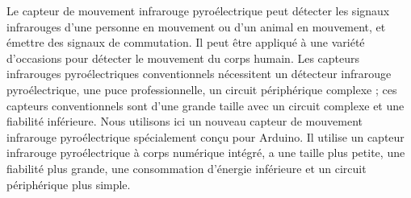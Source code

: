 \documentclass[a4paper, 11pt]{article}           %
\begin{document}
Le capteur de mouvement infrarouge pyroélectrique peut détecter les signaux infrarouges d'une personne en mouvement ou d'un animal en mouvement, et émettre des signaux de commutation. Il peut être appliqué à une variété d'occasions pour détecter le mouvement du corps humain. Les capteurs infrarouges pyroélectriques conventionnels nécessitent un détecteur infrarouge pyroélectrique, une puce professionnelle, un circuit périphérique complexe ; ces capteurs conventionnels sont d'une grande taille avec un circuit complexe et une fiabilité inférieure. Nous utilisons ici un nouveau capteur de mouvement infrarouge pyroélectrique spécialement conçu pour Arduino. Il utilise un capteur infrarouge pyroélectrique à corps numérique intégré, a une taille plus petite, une fiabilité plus grande, une consommation d'énergie inférieure et un circuit périphérique plus simple.
\end{document}
